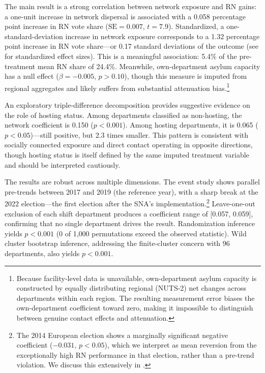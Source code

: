 \documentclass[12pt]{article}
\begin{document}
The main result is a strong correlation between network exposure and RN gains: a one-unit increase in network dispersal is associated with a 0.058 percentage point increase in RN vote share ($\text{SE} = 0.007$, $t = 7.9$). Standardized, a one-standard-deviation increase in network exposure corresponds to a 1.32 percentage point increase in RN vote share---or 0.17 standard deviations of the outcome (see  for standardized effect sizes). This is a meaningful association: 5.4\% of the pre-treatment mean RN share of 24.4\%. Meanwhile, own-department asylum capacity has a null effect ($\beta = -0.005$, $p > 0.10$), though this measure is imputed from regional aggregates and likely suffers from substantial attenuation bias.\footnote{Because facility-level data is unavailable, own-department asylum capacity is constructed by equally distributing regional (NUTS-2) net changes across departments within each region. The resulting measurement error biases the own-department coefficient toward zero, making it impossible to distinguish between genuine contact effects and attenuation.}

An exploratory triple-difference decomposition provides suggestive evidence on the role of hosting status. Among departments classified as non-hosting, the network coefficient is 0.150 ($p < 0.001$). Among hosting departments, it is 0.065 ($p < 0.05$)---still positive, but 2.3 times smaller. This pattern is consistent with socially connected exposure and direct contact operating in opposite directions, though hosting status is itself defined by the same imputed treatment variable and should be interpreted cautiously.

The results are robust across multiple dimensions. The event study shows parallel pre-trends between 2017 and 2019 (the reference year), with a sharp break at the 2022 election---the first election after the SNA's implementation.\footnote{The 2014 European election shows a marginally significant negative coefficient ($-0.031$, $p < 0.05$), which we interpret as mean reversion from the exceptionally high RN performance in that election, rather than a pre-trend violation. We discuss this extensively in .} Leave-one-out exclusion of each shift department produces a coefficient range of [0.057, 0.059], confirming that no single department drives the result. Randomization inference yields $p < 0.001$ (0 of 1,000 permutations exceed the observed statistic). Wild cluster bootstrap inference, addressing the finite-cluster concern with 96 departments, also yields $p < 0.001$.
\end{document}
